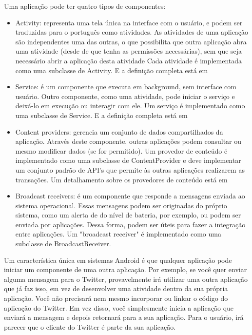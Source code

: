 Uma aplicação pode ter quatro tipos de componentes:
\begin{itemize}
    \item Activity: representa uma tela única na interface com o usuário, e podem 
    ser traduzidas para o português como atividades. As atividades
    de uma aplicação são independentes uma das outras, o que possibilita que outra aplicação 
    abra uma atividade (desde de que tenha as permissões necessárias), sem que seja
    necessário abrir a aplicação desta atividade
    Cada atividade é implementada como uma subclasse de Activity. E a definição 
    completa está em \cite{activity}
    \item Service: é um componente que executa em background, sem interface com 
    usuário. Outro componente, como uma atividade, pode iniciar o serviço e deixá-lo 
    em execução ou interagir com ele. Um serviço é implementado como uma subclasse de 
    Service. E a definição completa está em \cite{service}
    \item Content providers: gerencia um conjunto de dados compartilhados da aplicação. 
    Através deste componente, outras aplicações podem consultar ou mesmo modificar 
    dados (se for permitido). Um provedor de conteúdo é implementado como uma subclasse 
    de ContentProvider e deve implementar um conjunto padrão de API's que permite 
    às outras aplicações realizarem as transações. Um detalhamento sobre os provedores
    de conteúdo está em \cite{providers}
    \item Broadcast receivers: é um componente que responde a mensagens enviada ao 
    sistema operacional. Essas mensagens podem ser originadas do próprio sistema, 
    como um alerta de do nível de bateria, por exemplo, ou podem ser enviada por 
    aplicações. Dessa forma, podem ser úteis para fazer a integração entre aplicações.
    Um "broadcast receiver" é implementado como uma subclasse de BroadcastReceiver.
\end{itemize}

Um característica única em sistemas Android é que qualquer aplicação pode iniciar 
um componente de uma outra aplicação. Por exemplo, se você quer enviar alguma mensagem
para o Twitter, provavelmente irá utilizar uma outra aplicação que já faz isso, em vez
de desenvolver uma atividade dentro da sua própria aplicação. Você não precisará 
nem mesmo incorporar ou linkar o código do aplicação do Twitter. Em vez disso, você
simplesmente inicia a aplicação que enviará a mensagem e depois retornará para a sua 
aplicação. Para o usuário, irá parecer que o cliente do Twitter é parte da sua aplicação.


